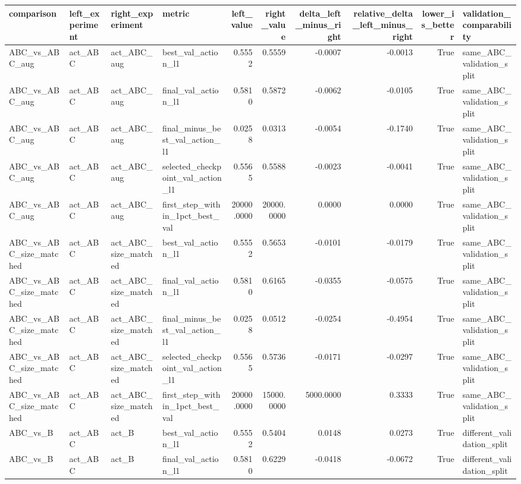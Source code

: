 \begin{tabular}{llllrrrrrl}
\toprule
comparison & left\_experiment & right\_experiment & metric & left\_value & right\_value & delta\_left\_minus\_right & relative\_delta\_left\_minus\_right & lower\_is\_better & validation\_comparability \\
\midrule
ABC\_vs\_ABC\_aug & act\_ABC & act\_ABC\_aug & best\_val\_action\_l1 & 0.5552 & 0.5559 & -0.0007 & -0.0013 & True & same\_ABC\_validation\_split \\
ABC\_vs\_ABC\_aug & act\_ABC & act\_ABC\_aug & final\_val\_action\_l1 & 0.5810 & 0.5872 & -0.0062 & -0.0105 & True & same\_ABC\_validation\_split \\
ABC\_vs\_ABC\_aug & act\_ABC & act\_ABC\_aug & final\_minus\_best\_val\_action\_l1 & 0.0258 & 0.0313 & -0.0054 & -0.1740 & True & same\_ABC\_validation\_split \\
ABC\_vs\_ABC\_aug & act\_ABC & act\_ABC\_aug & selected\_checkpoint\_val\_action\_l1 & 0.5565 & 0.5588 & -0.0023 & -0.0041 & True & same\_ABC\_validation\_split \\
ABC\_vs\_ABC\_aug & act\_ABC & act\_ABC\_aug & first\_step\_within\_1pct\_best\_val & 20000.0000 & 20000.0000 & 0.0000 & 0.0000 & True & same\_ABC\_validation\_split \\
ABC\_vs\_ABC\_size\_matched & act\_ABC & act\_ABC\_size\_matched & best\_val\_action\_l1 & 0.5552 & 0.5653 & -0.0101 & -0.0179 & True & same\_ABC\_validation\_split \\
ABC\_vs\_ABC\_size\_matched & act\_ABC & act\_ABC\_size\_matched & final\_val\_action\_l1 & 0.5810 & 0.6165 & -0.0355 & -0.0575 & True & same\_ABC\_validation\_split \\
ABC\_vs\_ABC\_size\_matched & act\_ABC & act\_ABC\_size\_matched & final\_minus\_best\_val\_action\_l1 & 0.0258 & 0.0512 & -0.0254 & -0.4954 & True & same\_ABC\_validation\_split \\
ABC\_vs\_ABC\_size\_matched & act\_ABC & act\_ABC\_size\_matched & selected\_checkpoint\_val\_action\_l1 & 0.5565 & 0.5736 & -0.0171 & -0.0297 & True & same\_ABC\_validation\_split \\
ABC\_vs\_ABC\_size\_matched & act\_ABC & act\_ABC\_size\_matched & first\_step\_within\_1pct\_best\_val & 20000.0000 & 15000.0000 & 5000.0000 & 0.3333 & True & same\_ABC\_validation\_split \\
ABC\_vs\_B & act\_ABC & act\_B & best\_val\_action\_l1 & 0.5552 & 0.5404 & 0.0148 & 0.0273 & True & different\_validation\_split \\
ABC\_vs\_B & act\_ABC & act\_B & final\_val\_action\_l1 & 0.5810 & 0.6229 & -0.0418 & -0.0672 & True & different\_validation\_split \\

\end{tabular}
